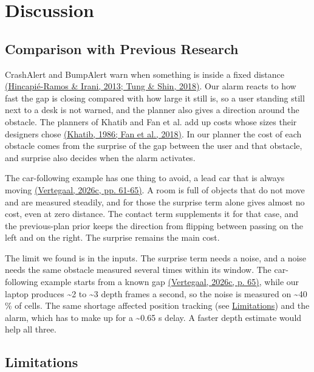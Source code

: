 \documentclass[a4paper]{article}
\begin{document}
\section{Discussion} \label{discussion}

\subsection{Comparison with Previous Research} \label{comparison-with-previous-research}

CrashAlert and BumpAlert warn when something is inside a fixed distance \hyperref[references]{(Hincapié-Ramos \& Irani, 2013; Tung \& Shin, 2018)}. Our alarm reacts to how fast the gap is closing compared with how large it still is, so a user standing still next to a desk is not warned, and the planner also gives a direction around the obstacle. The planners of Khatib and Fan et al. add up costs whose sizes their designers chose \hyperref[references]{(Khatib, 1986; Fan et al., 2018)}. In our planner the cost of each obstacle comes from the surprise of the gap between the user and that obstacle, and surprise also decides when the alarm activates.

The car-following example has one thing to avoid, a lead car that is always moving \hyperref[references]{(Vertegaal, 2026c, pp. 61-65)}. A room is full of objects that do not move and are measured steadily, and for those the surprise term alone gives almost no cost, even at zero distance. The contact term supplements it for that case, and the previous-plan prior keeps the direction from flipping between passing on the left and on the right. The surprise remains the main cost.

The limit we found is in the inputs. The surprise term needs a noise, and a noise needs the same obstacle measured several times within its window. The car-following example starts from a known gap \hyperref[references]{(Vertegaal, 2026c, p. 65)}, while our laptop produces \textasciitilde 2 to \textasciitilde 3 depth frames a second, so the noise is measured on \textasciitilde 40 \% of cells. The same shortage affected position tracking (see \hyperref[limitations]{Limitations}) and the alarm, which has to make up for a \textasciitilde 0.65 s delay. A faster depth estimate would help all three.

\subsection{Limitations} \label{limitations}
\end{document}
